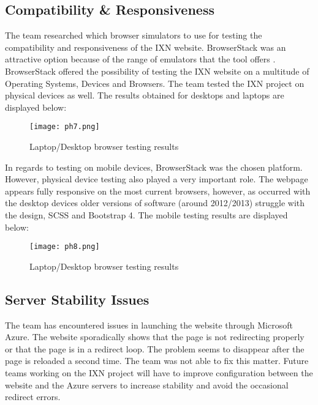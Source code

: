 \documentclass[fontsize=11pt]{extarticle}
\numberwithin{figure}{section} %
\begin{document}
\hypertarget{compatibility-responsiveness}{%
\subsection{Compatibility \&
Responsiveness}\label{compatibility-responsiveness}}

The team researched which browser simulators to use for testing the
compatibility and responsiveness of the IXN website. BrowserStack was an
attractive option because of the range of emulators that the tool offers
\cite{g6}. BrowserStack offered the possibility of testing the IXN
website on a multitude of Operating Systems, Devices and Browsers. The
team tested the IXN project on physical devices as well. The results
obtained for desktops and laptops are displayed below:

\begin{figure}[H]
      \centering
      \texttt{[image: ph7.png]}
      \caption{Laptop/Desktop browser testing results}
 \end{figure}

In regards to testing on mobile devices, BrowserStack was the chosen
platform. However, physical device testing also played a very important
role. The webpage appears fully responsive on the most current browsers,
however, as occurred with the desktop devices older versions of software
(around 2012/2013) struggle with the design, SCSS and Bootstrap 4. The
mobile testing results are displayed below:

\begin{figure}[H]
      \centering
      \texttt{[image: ph8.png]}
      \caption{Laptop/Desktop browser testing results}
 \end{figure}

\hypertarget{server-stability-issues}{%
\subsection{Server Stability Issues}\label{server-stability-issues}}

The team has encountered issues in launching the website through
Microsoft Azure. The website sporadically shows that the page is not
redirecting properly or that the page is in a redirect loop. The problem
seems to disappear after the page is reloaded a second time. The team
was not able to fix this matter. Future teams working on the IXN project
will have to improve configuration between the website and the Azure
servers to increase stability and avoid the occasional redirect errors.
\end{document}
